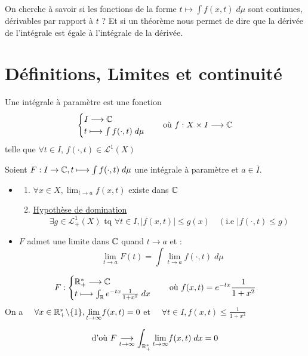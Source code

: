
On cherche à savoir si les fonctions de la forme $t \longmapsto \int f(x,t) \; d \mu$ sont continues, dérivables par rapport à $t$ ?
Et si un théorème nous permet de dire que la dérivée de l'intégrale est égale à l'intégrale de la dérivée. 

\section{Définitions, Limites et continuité}

\begin{definition}
    Une intégrale à paramètre est une fonction 
    \[ 
        \begin{cases}
            I \longrightarrow \mathbb{C} \\
            t \longmapsto \int f(\cdot, t) \; d \mu 
        \end{cases}
    \quad \text{où } f : X \times I \longrightarrow \mathbb{C} \]
    telle que $\forall t \in I $, $f(\cdot, t) \in \mathcal{L}^1(X) $
\end{definition}

\begin{theorem}
    Soient $F : I \rightarrow \mathbb{C}, t \longmapsto \int f(\cdot, t) \; d \mu $ une intégrale à paramètre et $a \in \overline{I}$.
    \begin{itemize}
        \item[\textbf{si}] \begin{enumerate}
                        \item $\forall x \in X, \lim_{t \to a} f(x,t)$ existe dans $\mathbb{C}$
                        \item \underline{Hypothèse de domination}
                            \[ \exists g \in \mathcal{L}_+^1(X) \text{ tq } \forall t \in I, |f(x,t)| \leq g(x) \quad (\text{i.e } |f(\cdot, t) \leq g) \]
                     \end{enumerate}
        \item[\textbf{alors}] $F$ admet une limite dans $\mathbb{C}$ quand $t \to a$ et :
                \[ \boxed{ \lim_{t\to a} F(t) = \int \lim_{t\to a} f(\cdot, t) \; d \mu } \] 
    \end{itemize}
\end{theorem}

\begin{example}
    \[ F :
        \begin{cases}
            \mathbb{R}_+^* \longrightarrow \mathbb{C} \\
            t \longmapsto \int_{\mathbb{R}} e^{-tx} \frac{1}{1 + x^2} \; d x 
        \end{cases} 
        \quad \text{où } f(x,t) = e^{-tx} \frac{1}{1 + x^2} 
    \] 
    On a $\quad \forall x \in \mathbb{R}_+^* \backslash \{1\}, \underset{t \to \infty}{\lim} f(x,t) = 0 $ et $ \quad \forall t \in I, f(x,t) \leq \frac{1}{1 + x^2}$ 

    \[ \text{d'où } F \underset{t \to \infty}{\longrightarrow} \int_{\mathbb{R}_+^*} \underset{t \to \infty}{\lim} f(x,t) \; d x = 0 \]
\end{example}

